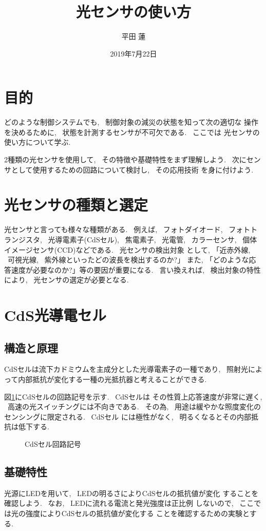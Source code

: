 \documentclass[titlepage]{jsarticle}
\title{光センサの使い方}
\author{平田 蓮}
\date{2019年7月22日}
\begin{document}
\maketitle
\section{目的}
    どのような制御システムでも, ~制御対象の減災の状態を知って次の適切な
    操作を決めるために, ~状態を計測するセンサが不可欠である. ~ここでは
    光センサの使い方について学ぶ.

    2種類の光センサを使用して, ~その特徴や基礎特性をまず理解しよう.
    ~次にセンサとして使用するための回路について検討し, ~その応用技術
    を身に付けよう.

\section{光センサの種類と選定}
    光センサと言っても様々な種類がある. ~例えば, ~フォトダイオード,
    ~フォトトランジスタ, ~光導電素子(CdSセル), ~焦電素子, ~光電管,
    ~カラーセンサ, ~個体イメージセンサ(CCD)などである. ~光センサの検出対象
    として, 「近赤外線, ~可視光線, ~紫外線といったどの波長を検出するのか?」
    また, 「どのような応答速度が必要なのか?」等の要因が重要になる.
    ~言い換えれば, ~検出対象の特性により, ~光センサの選定が必要となる.

\section{CdS光導電セル}
    \subsection{構造と原理}
        CdSセルは流下カドミウムを主成分とした光導電素子の一種であり,
        ~照射光によって内部抵抗が変化する一種の光抵抗器と考えることができる.

        図\ref{fig:CdS}にCdSセルの回路記号を示す. ~CdSセルは
        その性質上応答速度が非常に遅く, ~高速の光スイッチングには不向きである.
        ~その為, ~用途は緩やかな照度変化のセンシングに限定される. ~CdSセル
        には極性がなく, ~明るくなるとその内部抵抗は低下する.

        \begin{figure}[ht]
            \centering
            \caption{CdSセル回路記号}
            \label{fig:CdS}
        \end{figure}

    \subsection{基礎特性}
        光源にLEDを用いて, ~LEDの明るさによりCdSセルの抵抗値が変化
        することを確認しよう. ~なお, ~LEDに流れる電流と発光強度は正比例
        しないので, ~ここでは光の強度によりCdSセルの抵抗値が変化する
        ことを確認するための実験とする.
\end{document}
